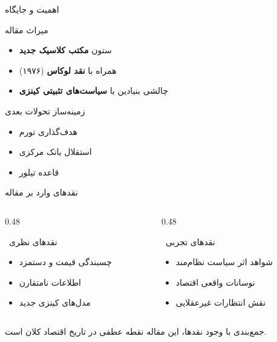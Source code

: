 \documentclass[aspectratio=169,11pt]{beamer}
\newcommand{\highlight}[1]{\textcolor{AccentOrange}{\textbf{#1}}}
\newcommand{\important}[1]{\textcolor{AlertRed}{\textbf{#1}}}
\newcommand{\keyword}[1]{\textcolor{MainBlue}{\textbf{#1}}}
\begin{document}
\begin{frame}{اهمیت و جایگاه}
	\begin{block}{میراث مقاله}
		\begin{itemize}
			\item ستون \keyword{مکتب کلاسیک جدید}
			\item همراه با \highlight{نقد لوکاس} (۱۹۷۶)
			\item چالشی بنیادین با \important{سیاست‌های تثبیتی کینزی}
		\end{itemize}
	\end{block}
	\vspace{0.3cm}
	\begin{exampleblock}{زمینه‌ساز تحولات بعدی}
		\begin{itemize}
			\item هدف‌گذاری تورم
			\item استقلال بانک مرکزی
			\item قاعده تیلور
		\end{itemize}
	\end{exampleblock}
\end{frame}

\begin{frame}{نقدهای وارد بر مقاله}
	\begin{LTR}
		\begin{columns}[T]
			\begin{column}{0.48\textwidth}
				\begin{RTL}
					\begin{alertblock}{\faExclamationTriangle\ نقدهای نظری}
						\begin{itemize}
							\item چسبندگی قیمت و دستمزد
							\item اطلاعات نامتقارن
							\item مدل‌های کینزی جدید
						\end{itemize}
					\end{alertblock}
				\end{RTL}
			\end{column}
			\hfill
			\begin{column}{0.48\textwidth}
				\begin{RTL}
					\begin{alertblock}{\faExclamationTriangle\ نقدهای تجربی}
						\begin{itemize}
							\item شواهد اثر سیاست نظام‌مند
							\item نوسانات واقعی اقتصاد
							\item نقش انتظارات غیرعقلایی
						\end{itemize}
					\end{alertblock}
				\end{RTL}
			\end{column}
		\end{columns}
	\end{LTR}
	\vspace{0.3cm}
	\begin{block}{جمع‌بندی}
		\centering
		با وجود نقدها، این مقاله نقطه عطفی در تاریخ اقتصاد کلان است.
	\end{block}
\end{frame}
\end{document}
